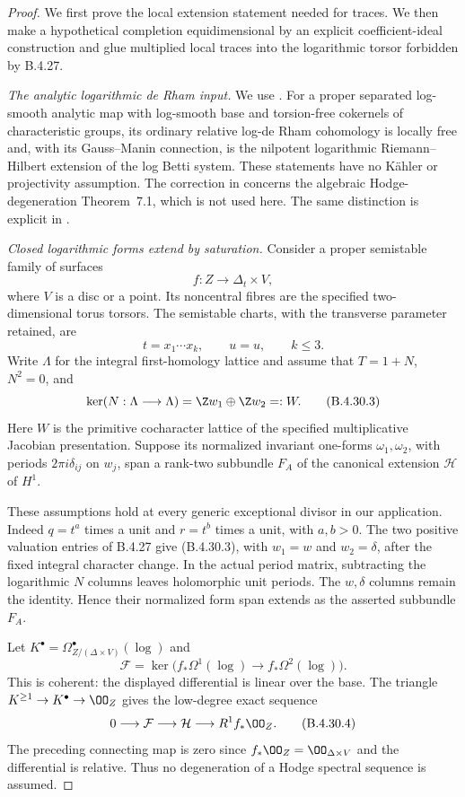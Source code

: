 \begin{proof}
We first prove the local extension statement
needed for traces. We then make a hypothetical
completion equidimensional by an explicit
coefficient-ideal construction and glue multiplied
local traces into the logarithmic torsor
forbidden by B.4.27.

\emph{The analytic logarithmic de Rham input.}
We use \citet[Theorems 6.2 and 6.3,
pp.~32 and 34]{IKN2005E}. For a proper separated
log-smooth analytic map with log-smooth base and
torsion-free cokernels of characteristic groups,
its ordinary relative log-de Rham cohomology is
locally free and, with its Gauss--Manin
connection, is the nilpotent logarithmic
Riemann--Hilbert extension of the log Betti
system. These statements have no K\"ahler or
projectivity assumption. The correction in
\citet{IKN2007ErratumE} concerns the algebraic
Hodge-degeneration Theorem~7.1, which is not
used here. The same distinction is explicit in
\citet[Definition 7.1(i) and Section 9.2,
pp.~164--165 and 173]{KKN2008PicardE}.

\emph{Closed logarithmic forms extend by saturation.}
Consider a proper semistable family of surfaces
\[
 f:Z\longrightarrow\Delta_t\times V,
 \tag{B.4.30.1}
\]
where $V$ is a disc or a point. Its noncentral
fibres are the specified two-dimensional torus
torsors. The semistable charts, with the
transverse parameter retained, are
\[
 t=x_1\cdots x_k,\qquad u=u,\qquad k\le3.
 \tag{B.4.30.2}
\]
Write $\Lambda$ for the integral first-homology
lattice and assume that $T=1+N$, $N^2=0$, and
\[
 \ker(N:\Lambda\longrightarrow\Lambda)
       =\Z w_1\oplus\Z w_2=:W.
 \tag{B.4.30.3}
\]
Here $W$ is the primitive cocharacter lattice
of the specified multiplicative Jacobian
presentation. Suppose its normalized invariant
one-forms $\omega_1,\omega_2$, with periods
$2\pi i\delta_{ij}$ on $w_j$, span a rank-two
subbundle $F_A$ of the canonical extension
$\mathcal H$ of $H^1$.

These assumptions hold at every generic
exceptional divisor in our application. Indeed
$q=t^a$ times a unit and $r=t^b$ times a unit,
with $a,b>0$. The two positive valuation entries
of B.4.27 give (B.4.30.3), with $w_1=w$ and
$w_2=\delta$, after the fixed integral character
change. In the actual period matrix, subtracting
the logarithmic $N$ columns leaves holomorphic
unit periods. The $w,\delta$ columns remain
the identity. Hence their normalized form span
extends as the asserted subbundle $F_A$.

Let $K^\bullet=\Omega^\bullet_{Z/(\Delta\times V)}
(\log)$ and
\[
 \mathcal F=\ker\bigl(f_*\Omega^1(\log)
                   \longrightarrow f_*\Omega^2(\log)\bigr).
\]
This is coherent: the displayed differential
is linear over the base. The triangle
$K^{\ge1}\to K^\bullet\to\OO_Z$ gives the
low-degree exact sequence
\[
 0\longrightarrow\mathcal F
 \longrightarrow\mathcal H
 \longrightarrow R^1f_*\OO_Z.
 \tag{B.4.30.4}
\]
The preceding connecting map is zero since
$f_*\OO_Z=\OO_{\Delta\times V}$ and the
differential is relative. Thus no degeneration
of a Hodge spectral sequence is assumed.


\end{proof}
